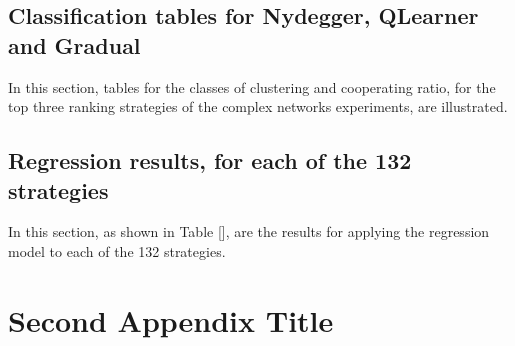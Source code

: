 \section{Classification tables for Nydegger, QLearner and Gradual}
\label{append:class-top-strategies}
In this section, tables for the classes of clustering and cooperating ratio,
for the top three ranking strategies of the complex networks experiments, are
illustrated.

\section{Regression results, for each of the 132 strategies}
\label{append:reg-results-strategies}
In this section, as shown in Table [], are the results for applying the regression
model to each of the 132 strategies.

\chapter{Second Appendix Title}

\lipsum[1-2]
